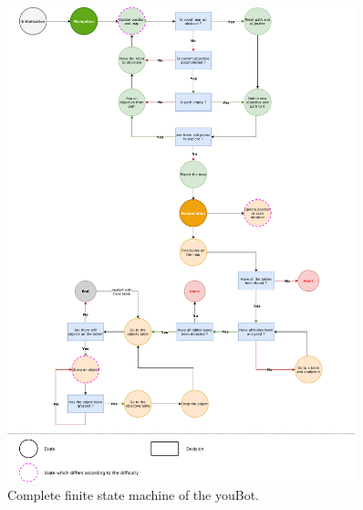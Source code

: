 \documentclass[a4paper, 10pt, conference]{ieeeconf}
\begin{document}
    \begin{figure}
        \centering
        \includegraphics[width=0.9\textwidth]{resources/pdf/fsm.pdf}
        \caption{Complete finite state machine of the youBot.}
        \label{fig:fsm}
    \end{figure}
\end{document}
